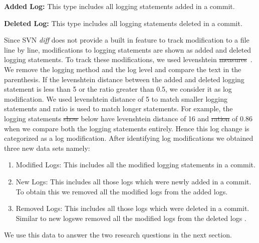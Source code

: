 \documentclass[conference]{IEEEtran}
\providecommand{\DIFadd}[1]{{\protect\color{blue}\uwave{#1}}} %
\providecommand{\DIFdel}[1]{{\protect\color{red}\sout{#1}}}                      %
\providecommand{\DIFaddbegin}{} %
\providecommand{\DIFaddend}{} %
\providecommand{\DIFdelbegin}{} %
\providecommand{\DIFdelend}{} %
\begin{document}

\textbf{Added Log:} This type includes all logging statements added
in a commit.

\textbf{Deleted Log:} This type includes all logging statements deleted in a commit.

Since SVN \textsl{diff} does not provide a built in feature to track
modification to a file line by line, modifications to logging statements are shown as added and deleted logging statements. To track these modifications, we used levenshtein \DIFdelbegin \DIFdel{measures}\DIFdelend \DIFaddbegin \DIFadd{measure}\DIFaddend ~\cite{Levenshtein2}. We remove the logging method and the log level and compare the text in the parenthesis. If the levenshtein distance between the added and deleted logging statement is less than 5 or the ratio greater than 0.5, we consider it as log modification. We used levenshtein distance of 5 to match smaller logging statements and ratio is used to match longer statements. For example, the logging statements \DIFdelbegin \DIFdel{show }\DIFdelend \DIFaddbegin \DIFadd{shown }\DIFaddend below have levenshtein distance of 16 and \DIFdelbegin \DIFdel{ration }\DIFdelend \DIFaddbegin \DIFadd{ratio }\DIFaddend of 0.86 when we compare both the logging statements entirely. Hence this log change is categorized as a log modification.  
 After identifying log modifications we obtained three new data sets namely:
\begin{enumerate}
\item Modified Logs: This includes all the modified logging statements in a commit.
\item New Logs: This includes all those logs which were newly added
in a commit. To obtain this we removed all the modified logs from
the added logs. 
\item Removed Logs: This includes all those logs which were deleted
in a commit. Similar to new logs\DIFaddbegin \DIFadd{, }\DIFaddend we removed all the modified logs
from the deleted logs \DIFaddbegin \DIFadd{to obtain this}\DIFaddend .
\end{enumerate}
We use this data to answer the two research questions in the next section.
\end{document}
